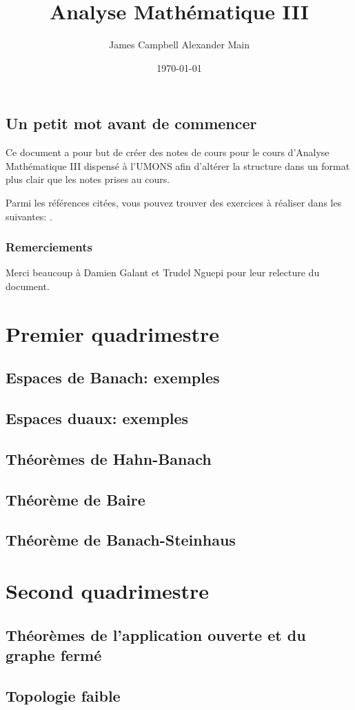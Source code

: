 \documentclass[a4paper, 12pt]{book}
\title{Analyse Mathématique III}
\author{James Campbell Alexander Main}
\date{\today}
\theoremstyle{definition} \newtheorem{df}{D\'{e}finition}[chapter]
\theoremstyle{definition} \newtheorem{ex}[df]{Exemple}
\theoremstyle{definition} \newtheorem{thm}[df]{Th\'{e}or\`{e}me}
\theoremstyle{definition} \newtheorem{cor}[df]{Corollaire}
\theoremstyle{definition} \newtheorem{lem}[df]{Lemme}
\theoremstyle{definition} \newtheorem{prop}[df]{Proposition}
\theoremstyle{definition} \newtheorem{rem}[df]{Remarque}
\theoremstyle{definition} \newtheorem{exo}{Exercice}[chapter]
\begin{document}
\frontmatter

\maketitle

\tableofcontents
\chapter{Un petit mot avant de commencer}
Ce document a pour but de créer des notes de cours
pour le cours d'Analyse Mathématique III dispensé
à l'UMONS afin d'altérer la structure dans un format
plus clair que les notes prises au cours.

Parmi les références citées, vous pouvez trouver des exercices
à réaliser dans les suivantes: \cite{hb:exo1}.

\section*{Remerciements}

Merci beaucoup à Damien Galant et Trudel Nguepi pour leur relecture du document.

\mainmatter
\part{Premier quadrimestre}
\chapter{Espaces de Banach: exemples}


\chapter{Espaces duaux: exemples}


\chapter{Théorèmes de Hahn-Banach}


\chapter{Théorème de Baire}


\chapter{Théorème de Banach-Steinhaus}


\part{Second quadrimestre}
\chapter{Théorèmes de l'application ouverte et du graphe fermé}



\chapter{Topologie faible}


\appendix




\end{document}
